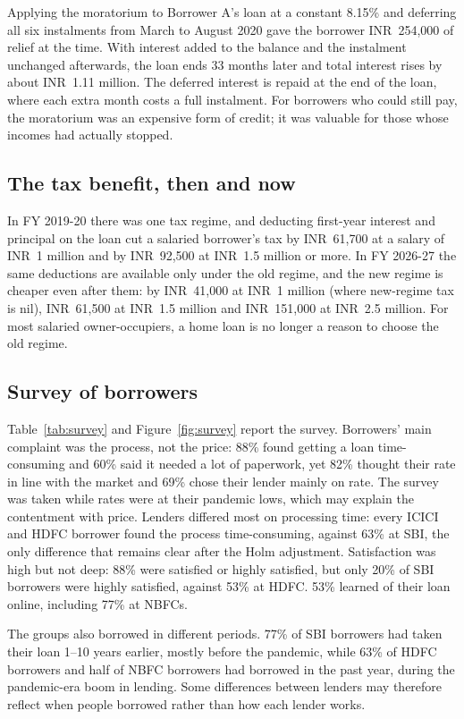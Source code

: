 \documentclass[sn-basic]{sn-jnl}
\newcommand{\INR}{INR~}
\begin{document}
Applying the moratorium to Borrower A's loan at a constant 8.15\% and deferring all six instalments from March to August 2020 gave the borrower \INR 254,000 of relief at the time. With interest added to the balance and the instalment unchanged afterwards, the loan ends 33 months later and total interest rises by about \INR 1.11 million. The deferred interest is repaid at the end of the loan, where each extra month costs a full instalment. For borrowers who could still pay, the moratorium was an expensive form of credit; it was valuable for those whose incomes had actually stopped.

\subsection{The tax benefit, then and now}

In FY 2019-20 there was one tax regime, and deducting first-year interest and principal on the loan cut a salaried borrower's tax by \INR 61,700 at a salary of \INR 1 million and by \INR 92,500 at \INR 1.5 million or more. In FY 2026-27 the same deductions are available only under the old regime, and the new regime is cheaper even after them: by \INR 41,000 at \INR 1 million (where new-regime tax is nil), \INR 61,500 at \INR 1.5 million and \INR 151,000 at \INR 2.5 million. For most salaried owner-occupiers, a home loan is no longer a reason to choose the old regime.

\subsection{Survey of borrowers}

Table~\ref{tab:survey} and Figure~\ref{fig:survey} report the survey. Borrowers' main complaint was the process, not the price: 88\% found getting a loan time-consuming and 60\% said it needed a lot of paperwork, yet 82\% thought their rate in line with the market and 69\% chose their lender mainly on rate. The survey was taken while rates were at their pandemic lows, which may explain the contentment with price. Lenders differed most on processing time: every ICICI and HDFC borrower found the process time-consuming, against 63\% at SBI, the only difference that remains clear after the Holm adjustment. Satisfaction was high but not deep: 88\% were satisfied or highly satisfied, but only 20\% of SBI borrowers were highly satisfied, against 53\% at HDFC. 53\% learned of their loan online, including 77\% at NBFCs.

The groups also borrowed in different periods. 77\% of SBI borrowers had taken their loan 1--10 years earlier, mostly before the pandemic, while 63\% of HDFC borrowers and half of NBFC borrowers had borrowed in the past year, during the pandemic-era boom in lending. Some differences between lenders may therefore reflect when people borrowed rather than how each lender works.
\end{document}
